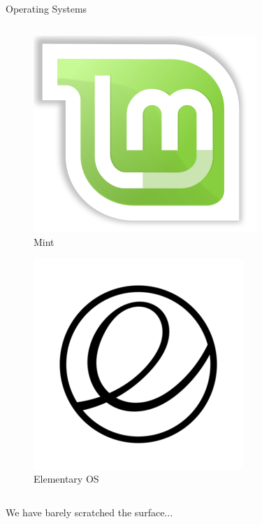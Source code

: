 \documentclass[10pt]{beamer}
\begin{document}
\begin{frame}{Operating Systems}
\begin{columns}
\begin{column}{0.5\textwidth}
\begin{figure}
                \end{figure}
                \begin{figure}
                    \includegraphics[height=0.12\paperheight]{images/mint}
                    \caption{Mint}
                \end{figure}
                \begin{figure}
                    \includegraphics[height=0.12\paperheight]{images/elementaryos}
                    \caption{Elementary OS}
                \end{figure}
            \end{column}
        \end{columns}
    \end{frame}
    
    \begin{frame}
        \begin{Huge}
            We have barely scratched the surface...
        \end{Huge}
    \end{frame}
\end{document}
